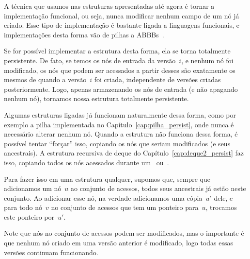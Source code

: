 \documentclass[main.tex]{subfiles}
\begin{document}
A técnica que usamos nas estruturas apresentadas até agora é tornar a implementação funcional, ou seja, nunca modificar nenhum campo de um nó já criado. Esse tipo de implementação é bastante ligada a linguagens funcionais, e implementações desta forma vão de pilhas a ABBBs~\cite{HoodMelville,KaplanT1999,Myers83,Myers84}.

Se for possível implementar a estrutura desta forma, ela se torna totalmente persistente. De fato, se temos os nós de entrada da versão~$i$, e nenhum nó foi modificado, os nós que podem ser acessados a partir desses são exatamente os mesmos de quando a versão~$i$ foi criada, independente de versões criadas posteriormente. Logo, apenas armazenando os nós de entrada (e não apagando nenhum nó), tornamos nossa estrutura totalmente persistente.

Algumas estruturas ligadas já funcionam naturalmente dessa forma, como por exemplo a pilha implementada no Capítulo~\ref{cap:pilha_persist}, onde nunca é necessário alterar nenhum nó. Quando a estrutura não funciona dessa forma, é possível tentar ``forçar'' isso, copiando os nós que seriam modificados (e seus ancestrais). A estrutura recursiva de deque do Capítulo~\ref{cap:deque2_persist} faz isso, copiando todos os nós acessados durante um~ ou~.

Para fazer isso em uma estrutura qualquer, supomos que, sempre que adicionamos um nó~$u$ ao conjunto de acessos, todos seus ancestrais já estão neste conjunto. Ao adicionar esse nó, na verdade adicionamos uma cópia~$u'$ dele, e para todo nó~$v$ no conjunto de acessos que tem um ponteiro para~$u$, trocamos este ponteiro por~$u'$.

Note que nós no conjunto de acessos podem ser modificados, mas o importante é que nenhum nó criado em uma versão anterior é modificado, logo todas essas versões continuam funcionando.
\end{document}
